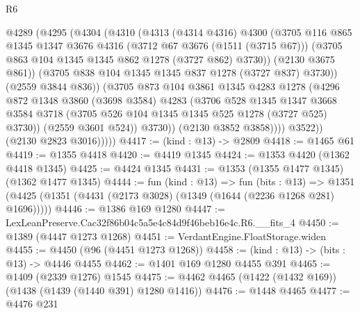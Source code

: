 \begin{lexlean}{R6}
\begin{coremodule}
                    @4289
                      (@4295
                        (@4304
                          (@4310
                            (@4313
                              (@4314 @4316)
                              @4300
                              (@3705
                                @116
                                @865
                                @1345
                                @1347
                                @3676
                                @4316
                                (@3712 @67 @3676 (@1511 (@3715 @67)))
                                (@3705 @863 @104 @1345 @1345 @862 @1278 (@3727 @862) @3730))
                              (@2130 @3675 @861))
                            (@3705 @838 @104 @1345 @1345 @837 @1278 (@3727 @837) @3730))
                          (@2559 @3844 @836))
                        (@3705
                          @873
                          @104
                          @3861
                          @1345
                          @4283
                          @1278
                          (@4296
                            @872
                            @1348
                            @3860
                            (@3698 @3584)
                            @4283
                            (@3706
                              @528
                              @1345
                              @1347
                              @3668
                              @3584
                              @3718
                              (@3705 @526 @104 @1345 @1345 @525 @1278 (@3727 @525) @3730))
                            (@2559 @3601 @524))
                          @3730))
                      (@2130 @3852 @3858))))
                @3522))
            (@2130 @2823 @3016)))))
@4417 := (kind : @13) -> @2809
@4418 := @1465 @61
@4419 := @1355 @4418
@4420 := @4419 @1345
@4424 := @1353 @4420 (@1362 @4418 @1345)
@4425 := @4424 @1345
@4431 := @1353 (@1355 @1477 @1345) (@1362 @1477 @1345)
@4444 := fun (kind : @13) =>
  fun (bits : @13) =>
  @1351 (@4425 (@1351 (@4431 (@2173 @3028) (@1349 (@1644 (@2236 @1268 @281) @1696)))))
@4446 := @1386 @169 @1280
@4447 := LexLeanPreserve.Cac32f86b04c5a5e4c84d9f46beb16e4c.R6.__fits_4
@4450 := @1389 (@4447 @1273 @1268)
@4451 := VerdantEngine.FloatStorage.widen
@4455 := @4450 (@96 (@4451 @1273 @1268))
@4458 := (kind : @13) -> (bits : @13) -> @4446 @4455
@4462 := @1401 @169 @1280 @4455 @391
@4465 := @1409 (@2339 @1276) @1545
@4475 := @4462 @4465 (@1422 (@1432 @169)) (@1438 (@1439 (@1440 @391) @1280 @1416))
@4476 := @1448 @4465
@4477 := @4476 @231

\end{coremodule}
\end{lexlean}
